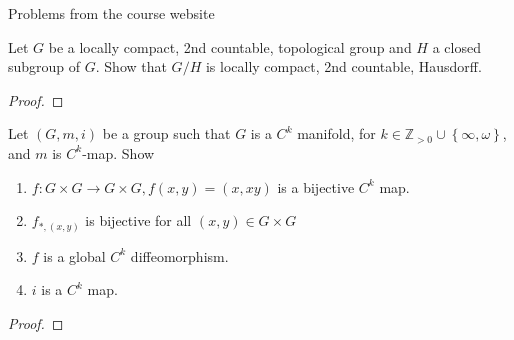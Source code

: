 \documentclass[12pt]{article}
\newcommand{\Z}{\mathbb{Z}}
\theoremstyle{definition}
\newenvironment{problem}[2][Problem]{\begin{trivlist}
\item[\hskip \labelsep {\bfseries #1}\hskip \labelsep {\bfseries #2.}]}{\end{trivlist}}
\begin{document}
\begin{section}{Problems from the course website}
\begin{problem}{1*}
	Let $G$ be a locally compact, 2nd countable, topological group and $H$ a closed subgroup of $G$. Show that $G/H$ is locally compact, 2nd countable, Hausdorff.
\end{problem}
\begin{proof}
	
\end{proof}
\begin{problem}{2*}
	Let $(G,m,i)$ be a group such that $G$ is a $C^k$ manifold, for $k \in \Z_{>0} \cup \left\{ \infty, \omega \right\}$, and $m$ is $C^k$-map. Show 
	\begin{enumerate}[label=(\alph*)]
		\item $f: G \times G \to G \times G, f(x,y) = (x, xy)$ is a bijective $C^k$ map.
		\item $f_{*, (x,y)}$ is bijective for all $(x,y) \in G \times G$
		\item $f$ is a global $C^k$ diffeomorphism.
		\item $i$ is a $C^k$ map.
	\end{enumerate}
\end{problem}
\begin{proof}
	

\end{proof}
\end{section}
\end{document}

